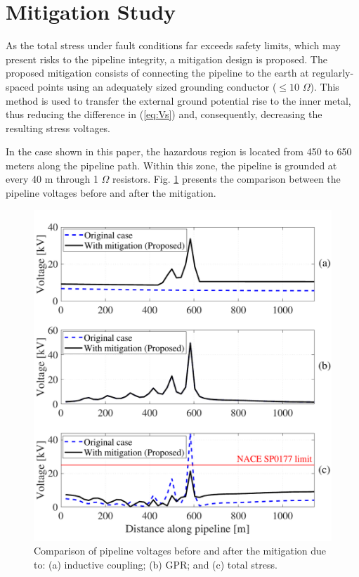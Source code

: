 \documentclass{IEEEtran4PSCC}
\begin{document}
\section{Mitigation Study}

As the total stress under fault conditions far exceeds safety limits, which may present risks to the pipeline integrity, a mitigation design is proposed. The proposed mitigation consists of connecting the pipeline to the earth at regularly-spaced points using an adequately sized grounding conductor ($\leq 10$ $\Omega$). This method is used to transfer the external ground potential rise to the inner metal, thus reducing the difference in (\ref{eq:Vs}) and, consequently, decreasing the resulting stress voltages. 

In the case shown in this paper, the hazardous region is located from 450 to 650 meters along the pipeline path. Within this zone, the pipeline is grounded at every 40 m through 1 $\Omega$ resistors. Fig. \ref{fig:Mitvoltage} presents the comparison between the pipeline voltages before and after the mitigation.    

\begin{figure}[hbt]
	\begin{center}
		\includegraphics[width=1\columnwidth]{./fig/Mit_voltage2.pdf}
		\caption{Comparison of pipeline voltages before and after the mitigation due to: (a) inductive coupling; (b) GPR; and (c) total stress.}
		\label{fig:Mitvoltage}
	\end{center}
\end{figure}
\end{document}
